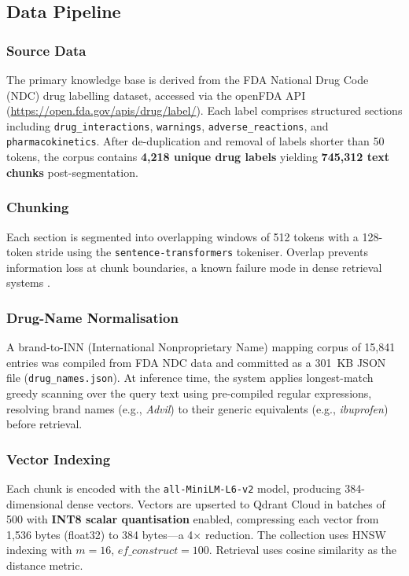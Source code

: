 \documentclass[10pt, twocolumn]{article}
\begin{document}
\subsection{Data Pipeline}

\subsubsection{Source Data}
The primary knowledge base is derived from the FDA National Drug Code
(NDC) drug labelling dataset, accessed via the openFDA API
(\url{https://open.fda.gov/apis/drug/label/}).  Each label comprises
structured sections including \texttt{drug\_interactions},
\texttt{warnings}, \texttt{adverse\_reactions}, and
\texttt{pharmacokinetics}.  After de-duplication and removal of labels
shorter than 50 tokens, the corpus contains \textbf{4,218 unique drug
labels} yielding \textbf{745,312 text chunks} post-segmentation.

\subsubsection{Chunking}
Each section is segmented into overlapping windows of 512 tokens with a
128-token stride using the \texttt{sentence-transformers} tokeniser.
Overlap prevents information loss at chunk boundaries, a known failure
mode in dense retrieval systems \cite{ram2023context}.

\subsubsection{Drug-Name Normalisation}
A brand-to-INN (International Nonproprietary Name) mapping corpus of
15,841 entries was compiled from FDA NDC data and committed as a 301~KB
JSON file (\texttt{drug\_names.json}).  At inference time, the system
applies longest-match greedy scanning over the query text using
pre-compiled regular expressions, resolving brand names (e.g.,
\textit{Advil}) to their generic equivalents (e.g., \textit{ibuprofen})
before retrieval.

\subsubsection{Vector Indexing}
Each chunk is encoded with the \texttt{all-MiniLM-L6-v2}
\cite{reimers2019sentence} model, producing 384-dimensional dense
vectors.  Vectors are upserted to Qdrant Cloud in batches of 500 with
\textbf{INT8 scalar quantisation} enabled, compressing each vector from
1,536 bytes (float32) to 384 bytes—a 4$\times$ reduction.  The
collection uses HNSW indexing \cite{malkov2020hnsw} with $m = 16$,
$\textit{ef\_construct} = 100$.  Retrieval uses cosine similarity as the
distance metric.
\end{document}
